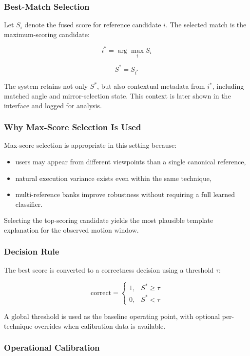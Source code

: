 \documentclass[12pt]{article}
\begin{document}
{\subsubsection{Best-Match Selection}

Let \(S_i\) denote the fused score for reference candidate \(i\). The selected match is the maximum-scoring candidate:

\[
i^{*}=\arg\max_i S_i
\]

\[
S^{*}=S_{i^{*}}
\]

The system retains not only \(S^{*}\), but also contextual metadata from \(i^{*}\), including matched angle and mirror-selection state. This context is later shown in the interface and logged for analysis.

\subsubsection{Why Max-Score Selection Is Used}

Max-score selection is appropriate in this setting because:
\begin{itemize}
    \item users may appear from different viewpoints than a single canonical reference,
    \item natural execution variance exists even within the same technique,
    \item multi-reference banks improve robustness without requiring a full learned classifier.
\end{itemize}

Selecting the top-scoring candidate yields the most plausible template explanation for the observed motion window.

\subsubsection{Decision Rule}

The best score is converted to a correctness decision using a threshold \(\tau\):

\[
\text{correct}=
\begin{cases}
1, & S^{*}\ge\tau \\
0, & S^{*}<\tau
\end{cases}
\]

A global threshold is used as the baseline operating point, with optional per-technique overrides when calibration data is available.

\subsubsection{Operational Calibration}

}
\end{document}
